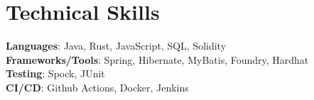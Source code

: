 \documentclass[letterpaper,11pt]{article}
\makeatletter
\newcommand{\resumeItem}[1]{
    \item\small{
            {#1 \vspace{-2pt}}
    }
}
\newcommand{\resumeProjectHeading}[2]{
    \item
    \begin{tabular*}{0.97\textwidth}{l@{\extracolsep{\fill}}r}
    \small#1 & #2 \\
    \end{tabular*}\vspace{-7pt}
}
\newcommand{\resumeSubHeadingListStart}{\begin{itemize}[leftmargin=0.15in, label={}]}
\newcommand{\resumeSubHeadingListEnd}{\end{itemize}}
\newcommand{\resumeItemListStart}{\begin{itemize}}
\newcommand{\resumeItemListEnd}{\end{itemize}\vspace{-5pt}}
\makeatother
\begin{document}

%
\section{Technical Skills}
\begin{itemize}[leftmargin=0.15in, label={}]
\small{\item{
\textbf{Languages}{: Java, Rust, JavaScript, SQL, Solidity} \\
\textbf{Frameworks/Tools}{: Spring, Hibernate, MyBatis, Foundry, Hardhat} \\
\textbf{Testing}{: Spock, JUnit} \\
\textbf{CI/CD}{: Github Actions, Docker, Jenkins} \\
}}
\end{itemize}


\end{document}
